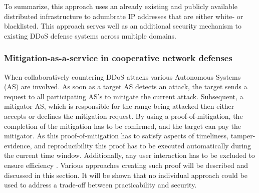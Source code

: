 To summarize, this approach uses an already existing and publicly available distributed infrastructure to adumbrate IP addresses that are either white- or blacklisted. This approach serves well as an additional security mechanism to existing DDoS defense systems across multiple domains.

\subsubsection{Mitigation-as-a-service in cooperative network defenses}
When collaboratively countering DDoS attacks various Autonomous Systems (AS) are involved. As soon as a target AS detects an attack, the target sends a request to all participating AS's to mitigate the current attack. Subsequent, a mitigator AS, which is responsible for the range being attacked then either accepts or declines the mitigation request. By using a proof-of-mitigation, the completion of the mitigation has to be confirmed, and the target can pay the mitigator. As this proof-of-mitigation has to satisfy aspects of timeliness, tamper-evidence, and reproducibility this proof has to be executed automatically during the current time window. Additionally, any user interaction has to be excluded to ensure efficiency \cite{Mannhart2018}. Various approaches creating such proof will be described and discussed in this section. It will be shown that no individual approach could be used to address a trade-off between practicability and security.

